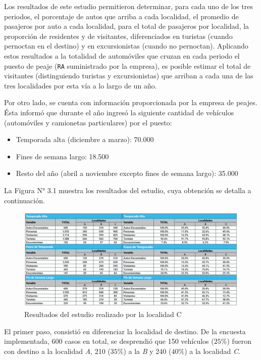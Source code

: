 \documentclass[
]{book}
\begin{document}
Los resultados de este estudio permitieron determinar, para cada uno de los tres periodos, el porcentaje de autos que arriba a cada localidad, el promedio de pasajeros por auto a cada localidad, para el total de pasajeros por localidad, la proporción de residentes y de visitantes, diferenciados en turistas (cuando pernoctan en el destino) y en excursionistas (cuando no pernoctan). Aplicando estos resultados a la totalidad de automóviles que cruzan en cada periodo el puesto de peaje (\texttt{RA} suministrado por la empresa), es posible estimar el total de visitantes (distinguiendo turistas y excursionistas) que arriban a cada una de las tres localidades por esta vía a lo largo de un año.

Por otro lado, se cuenta con información proporcionada por la empresa de peajes. Ésta informó que durante el año ingresó la siguiente cantidad de vehículos (automóviles y camionetas particulares) por el puesto:

\begin{itemize}
\item
  Temporada alta (diciembre a marzo): 70.000
\item
  Fines de semana largo: 18.500
\item
  Resto del año (abril a noviembre excepto fines de semana largo): 35.000
\end{itemize}

La Figura N° 3.1 muestra los resultados del estudio, cuya obtención se detalla a continuación.

\begin{figure}

{\centering \includegraphics[width=1\linewidth]{imagenes/figura04} 

}

\caption{Resultados del estudio realizado por la localidad C}\label{fig:estudioslocalidade}
\end{figure}

El primer paso, consistió en diferenciar la localidad de destino. De la encuesta implementada, 600 casos en total, se desprendió que 150 vehículos (\(25\%\)) fueron con destino a la localidad \emph{A}, 210 (\(35\%\)) a la \emph{B} y 240 (\(40\%\)) a la localidad \emph{C}.
\end{document}
